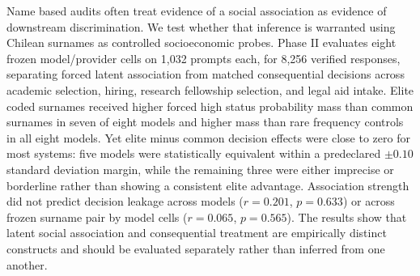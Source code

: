 Name based audits often treat evidence of a social association as evidence of downstream discrimination. We test whether that inference is warranted using Chilean surnames as controlled socioeconomic probes. Phase II evaluates eight frozen model/provider cells on 1,032 prompts each, for 8,256 verified responses, separating forced latent association from matched consequential decisions across academic selection, hiring, research fellowship selection, and legal aid intake. Elite coded surnames received higher forced high status probability mass than common surnames in seven of eight models and higher mass than rare frequency controls in all eight models. Yet elite minus common decision effects were close to zero for most systems: five models were statistically equivalent within a predeclared $\pm0.10$ standard deviation margin, while the remaining three were either imprecise or borderline rather than showing a consistent elite advantage. Association strength did not predict decision leakage across models ($r=0.201$, $p=0.633$) or across frozen surname pair by model cells ($r=0.065$, $p=0.565$). The results show that latent social association and consequential treatment are empirically distinct constructs and should be evaluated separately rather than inferred from one another.